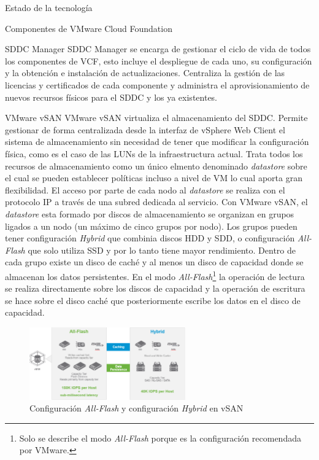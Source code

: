\begin{section}{Estado de la tecnología}
\begin{subsection}{Componentes de VMware Cloud Foundation \cite{componentesCloudFound}}
\begin{subsubsection}{SDDC Manager}
    SDDC Manager se encarga de gestionar el ciclo de vida de todos los componentes de VCF, esto incluye el despliegue de cada uno, su configuración y la obtención e instalación de actualizaciones. Centraliza la gestión de las licencias y certificados de cada componente y administra el aprovisionamiento de nuevos recursos físicos para el SDDC y los ya existentes.
\end{subsubsection}

\begin{subsubsection}{VMware vSAN}
    VMware vSAN virtualiza el almacenamiento del SDDC. Permite gestionar de forma centralizada desde la interfaz de vSphere Web Client el sistema de almacenamiento sin necesidad de tener que modificar la configuración física, como es el caso de las LUNs de la infraestructura actual. Trata todos los recursos de almacenamiento como un único elmento denominado \textit{datastore} sobre el cual se pueden establecer políticas incluso a nivel de VM lo cual aporta gran flexibilidad. El acceso por parte de cada nodo al \textit{datastore} se realiza con el protocolo IP a través de una subred dedicada al servicio. Con VMware vSAN, el \textit{datastore} esta formado por discos de almacenamiento se organizan en grupos ligados a un nodo (un máximo de cinco grupos por nodo). Los grupos pueden tener configuración \textit{Hybrid} que combinia discos HDD y SDD, o configuración \textit{All-Flash} que solo utiliza SSD y por lo tanto tiene mayor rendimiento. Dentro de cada grupo existe un disco de caché y al menos un disco de capacidad donde se almacenan los datos persistentes\cite{operacionesVSAN}. En el modo \textit{All-Flash}\footnote{Solo se describe el modo \textit{All-Flash} porque es la configuración recomendada por VMware.} la operación de lectura se realiza directamente sobre los discos de capacidad y la operación de escritura se hace sobre el disco caché que posteriormente escribe los datos en el disco de capacidad.
    
    \begin{figure}[h!]
    \centering
        \includegraphics[width=0.6\textwidth]{imaxes/cap2recursos/rendimientoVSAN.png}
        \caption{Configuración \textit{All-Flash} y configuración \textit{Hybrid} en vSAN}
        \label{fig:performance-Hybrid-AllFlash-vSAN}
    \end{figure}
    \FloatBarrier
\end{subsubsection}


\end{subsection}
\end{section}
